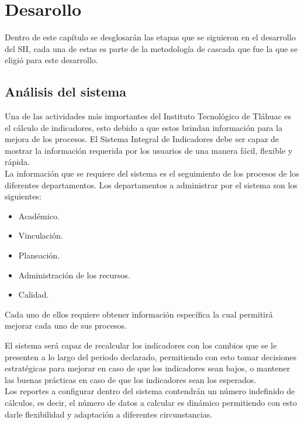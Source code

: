 \chapter{Desarollo}

	Dentro de este cap\'itulo se desglosar\'an las etapas que se siguieron en el desarrollo del SII, cada una de estas es parte de la metodolog\'ia de cascada que fue la que se eligi\'o para este desarrollo.

	\section{An\'alisis del sistema}
		Una de las actividades m\'as importantes del Instituto Tecnol\'ogico de Tl\'ahuac es el c\'alculo de indicadores, esto debido a que estos brindan informaci\'on para la mejora de los procesos. El Sistema Integral de Indicadores debe ser capaz de mostrar la informaci\'on requerida por los usuarios de una manera f\'acil, flexible y r\'apida.\\

		La informaci\'on que se requiere del sistema es el seguimiento de los procesos de los diferentes departamentos. Los departamentos a administrar por el sistema son los siguientes:

		\begin{itemize}
			\item Acad\'emico.
			\item Vinculaci\'on.
			\item Planeaci\'on.
			\item Administraci\'on de los recursos.
			\item Calidad.
		\end{itemize}

		Cada uno de ellos requiere obtener informaci\'on espec\'ifica la cual permitir\'a mejorar cada uno de sus procesos.

		El sistema ser\'a capaz de recalcular los indicadores con los cambios que se le presenten a lo largo del periodo declarado, permitiendo con esto tomar decisiones estrat\'egicas para mejorar en caso de que los indicadores sean bajos, o mantener las buenas pr\'acticas en caso de que los indicadores sean los esperados.\\

		Los reportes a configurar dentro del sistema contendr\'an un n\'umero indefinido de c\'alculos, es decir, el n\'umero de datos a calcular es din\'amico permitiendo con esto darle flexibilidad y adaptaci\'on a diferentes circunstancias.\\


